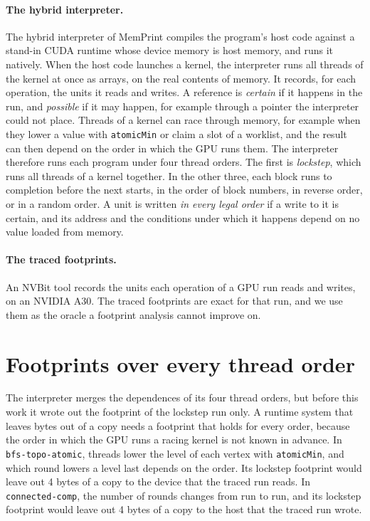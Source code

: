 \documentclass[11pt]{article}
\newcommand{\memprint}{MemPrint}
\newcommand{\term}[1]{\emph{#1}}
\newcommand{\code}[1]{\texttt{#1}}
\begin{document}
\paragraph{The hybrid interpreter.} The hybrid interpreter of \memprint{} compiles the program's host code against a
stand-in CUDA runtime whose device memory is host memory, and runs it natively. When the host code launches a
kernel, the interpreter runs all threads of the kernel at once as arrays, on the real contents of memory. It
records, for each operation, the units it reads and writes. A reference is \term{certain} if it happens in the run,
and \term{possible} if it may happen, for example through a pointer the interpreter could not place. Threads of a
kernel can race through memory, for example when they lower a value with \code{atomicMin} or claim a slot of a
worklist, and the result can then depend on the order in which the GPU runs them. The interpreter therefore runs
each program under four thread orders. The first is \term{lockstep}, which runs all threads of a kernel together.
In the other three, each block runs to completion before the next starts, in the order of block numbers, in
reverse order, or in a random order. A unit is written \term{in every
legal order} if a write to it is certain, and its address and the conditions under which it happens depend on no
value loaded from memory.

\paragraph{The traced footprints.} An NVBit tool records the units each operation of a GPU run reads and writes, on
an NVIDIA A30. The traced footprints are exact for that run, and we use them as the oracle a footprint analysis
cannot improve on.

\section{Footprints over every thread order}
\label{sec:union}

The interpreter merges the dependences of its four thread orders, but before this work it wrote out the footprint
of the lockstep run only. A runtime system that leaves bytes out of a copy needs a footprint that holds for every
order, because the order in which the GPU runs a racing kernel is not known in advance. In
\code{bfs-topo-atomic}, threads lower the level of each vertex with \code{atomicMin}, and which round lowers a level
last depends on the order. Its lockstep footprint would leave out 4 bytes of a copy to the device that the traced
run reads. In \code{connected-comp}, the number of rounds changes from run to run, and its lockstep footprint would
leave out 4 bytes of a copy to the host that the traced run wrote.
\end{document}
